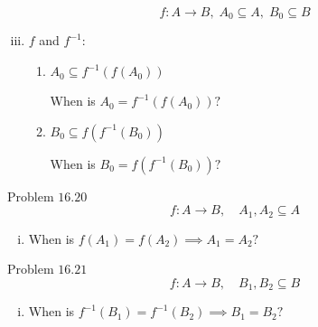 \begin{frame}{}
  \begin{theorem}
    \[
      f: A \to B,\; A_0 \subseteq A,\; B_0 \subseteq B
    \]

    \vspace{-0.10cm}
    \begin{enumerate}[(i)]
      \setcounter{enumi}{2}
      \item $f$ and $f^{-1}$: \\[8pt]
	\begin{enumerate}[(1)]
	  \setlength{\itemsep}{15pt}
	  \setcounter{enumii}{8}
	    \item $A_0 \subseteq f^{-1}(f(A_0))$
	      \centerline{ When is $A_0 = f^{-1}(f(A_0))?$}
	    \pause
	    \item $B_0 \subseteq f(f^{-1}(B_0))$
	      \centerline{ When is $B_0 = f(f^{-1}(B_0))?$}
	\end{enumerate}
    \end{enumerate}
  \end{theorem}
\end{frame}

\begin{frame}{}
  \begin{exampleblock}{Problem $16.20$}
    \[
      f: A \to B, \quad A_1, A_2 \subseteq A
    \]

    \begin{enumerate}[(i)]
      \centering
      \item When is $f(A_1) = f(A_2) \implies A_1 = A_2?$
    \end{enumerate}
  \end{exampleblock}
\end{frame}

\begin{frame}{}
  \begin{exampleblock}{Problem $16.21$}
    \[
      f: A \to B, \quad B_1, B_2 \subseteq B
    \]

    \begin{enumerate}[(i)]
      \centering
      \item When is $f^{-1}(B_1) = f^{-1}(B_2) \implies B_1 = B_2?$
    \end{enumerate}
  \end{exampleblock}
\end{frame}
